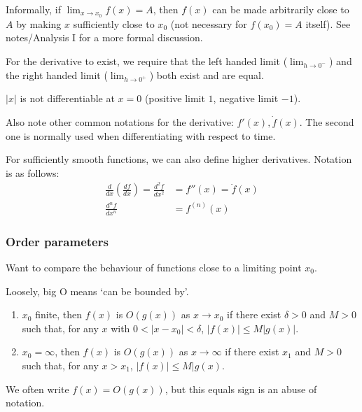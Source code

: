\documentclass{../template/note}
\begin{document}
    \begin{remark*}[Limits]
        Informally, if \(\lim_{x\to x_0}f(x) = A\), then \(f(x)\) can be made arbitrarily close to \(A\) by making \(x\) sufficiently close to \(x_0\) (not necessary for \(f(x_0) = A\) itself). See notes/Analysis I for a more formal discussion.
    \end{remark*}
    
    
    For the derivative to exist, we require that the left handed limit (\(\lim_{h\to 0^-}\)) and the right handed limit (\(\lim_{h\to 0^+}\)) both exist and are equal.

    \begin{example}
        \(|x|\) is not differentiable at \(x=0\) (positive limit \(1\), negative limit \(-1\)).
    \end{example}

    Also note other common notations for the derivative: \(f'(x), \dot f(x)\). The second one is normally used when differentiating with respect to time.

    For sufficiently smooth functions, we can also define higher derivatives. Notation is as follows:
    \begin{align*}
        \frac{d}{dx} \left(\frac{df}{dx}\right) = \frac{d^2f}{dx^2} &= f''(x) = \ddot f(x) \\
        \frac{d^nf}{dx^n} &= f^{(n)}(x)
    \end{align*}

    \subsubsection{Order parameters}

    Want to compare the behaviour of functions close to a limiting point \(x_0\).

    \begin{definition}
        Loosely, big O means `can be bounded by'.
        \begin{enumerate}[label=Case \arabic*.,leftmargin=55px]
            \item \(x_0\) finite, then \(f(x)\) is \(O(g(x))\) as \(x \to x_0\) if there exist \(\delta > 0\) and \(M > 0\) such that, for any \(x\) with \(0 < |x-x_0| < \delta\), \(|f(x)| \leq M|g(x)|\).
            \item \(x_0 = \infty\), then \(f(x)\) is \(O(g(x))\) as \(x \to \infty\) if there exist \(x_1\) and \(M > 0\) such that, for any \(x > x_1\), \(|f(x)| \leq M|g(x)\).
        \end{enumerate}
        We often write \(f(x) = O(g(x))\), but this equals sign is an abuse of notation.
    \end{definition}
\end{document}
